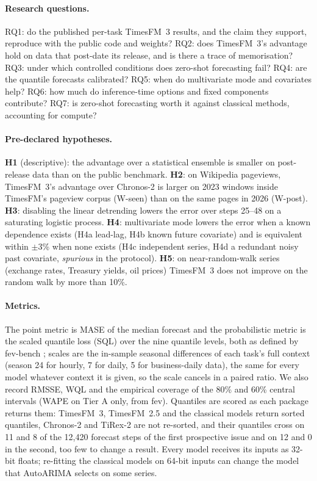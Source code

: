 \paragraph{Research questions.} RQ1: do the published per-task TimesFM~3 results, and the claim they support, reproduce with the
public code and weights? RQ2: does TimesFM~3's advantage hold on data that post-date its release, and is there a trace of
memorisation? RQ3: under which controlled conditions does zero-shot forecasting fail? RQ4: are the quantile forecasts calibrated?
RQ5: when do multivariate mode and covariates help? RQ6: how much do inference-time options and fixed components contribute? RQ7: is
zero-shot forecasting worth it against classical methods, accounting for compute?

\paragraph{Pre-declared hypotheses.} \textbf{H1} (descriptive): the advantage over a statistical ensemble is smaller on post-release
data than on the public benchmark. \textbf{H2}: on Wikipedia pageviews, TimesFM~3's advantage over Chronos-2 is larger on
2023 windows inside TimesFM's pageview corpus (W-seen) than on the same pages in 2026 (W-post). \textbf{H3}: disabling the linear
detrending lowers the error over steps 25--48 on a saturating logistic process. \textbf{H4}: multivariate mode lowers the error
when a known dependence exists (H4a lead-lag, H4b known future covariate) and is equivalent within $\pm$3\% when none exists (H4c
independent series, H4d a redundant noisy past covariate, \emph{spurious} in the protocol). \textbf{H5}: on near-random-walk series (exchange rates, Treasury yields, oil prices)
TimesFM~3 does not improve on the random walk by more than 10\%.

\paragraph{Metrics.} The point metric is MASE of the median forecast and the probabilistic metric is the scaled quantile loss (SQL)
over the nine quantile levels, both as defined by fev-bench \citep{shchur2025fevbench}; scales are the in-sample seasonal
differences of each task's full context (season 24 for hourly, 7 for daily, 5 for business-daily data), the same for every model
whatever context it is given, so the scale cancels in a paired ratio. We also record RMSSE, WQL and the
empirical coverage of the 80\% and 60\% central intervals (WAPE on Tier A only, from fev). Quantiles are scored as each package returns
them: TimesFM~3, TimesFM~2.5 and the classical models return sorted quantiles, Chronos-2 and TiRex-2 are not re-sorted, and their
quantiles cross on 11 and 8 of the 12{,}420 forecast steps of the first prospective issue and on 12 and 0 in the second, too few to
change a result. Every model
receives its inputs as 32-bit floats; re-fitting the classical models on 64-bit inputs can change the model that AutoARIMA selects
on some series.


